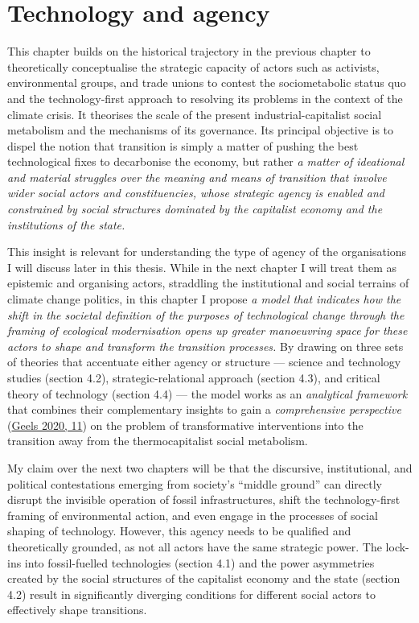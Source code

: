 \documentclass[a4paper, nobind]{templates/ociamthesis}
\begin{document}
\hypertarget{technology-and-agency}{%
\chapter{Technology and agency}\label{technology-and-agency}}

\minitoc

This chapter builds on the historical trajectory in the previous chapter to theoretically conceptualise the strategic capacity of actors such as activists, environmental groups, and trade unions to contest the sociometabolic status quo and the technology-first approach to resolving its problems in the context of the climate crisis. It theorises the scale of the present industrial-capitalist social metabolism and the mechanisms of its governance. Its principal objective is to dispel the notion that transition is simply a matter of pushing the best technological fixes to decarbonise the economy, but rather \emph{a matter of ideational and material struggles over the meaning and means of transition that involve wider social actors and constituencies, whose strategic agency is enabled and constrained by social structures dominated by the capitalist economy and the institutions of the state.}

This insight is relevant for understanding the type of agency of the organisations I will discuss later in this thesis. While in the next chapter I will treat them as epistemic and organising actors, straddling the institutional and social terrains of climate change politics, in this chapter I propose \emph{a model that indicates how the shift in the societal definition of the purposes of technological change through the framing of ecological modernisation opens up greater manoeuvring space for these actors to shape and transform the transition processes.} By drawing on three sets of theories that accentuate either agency or structure --- science and technology studies (section 4.2), strategic-relational approach (section 4.3), and critical theory of technology (section 4.4) --- the model works as an \emph{analytical framework} that combines their complementary insights to gain a \emph{comprehensive perspective} (\protect\hyperlink{ref-geels_micro-foundations_2020}{Geels 2020, 11}) on the problem of transformative interventions into the transition away from the thermocapitalist social metabolism.

My claim over the next two chapters will be that the discursive, institutional, and political contestations emerging from society's ``middle ground'' can directly disrupt the invisible operation of fossil infrastructures, shift the technology-first framing of environmental action, and even engage in the processes of social shaping of technology. However, this agency needs to be qualified and theoretically grounded, as not all actors have the same strategic power. The lock-ins into fossil-fuelled technologies (section 4.1) and the power asymmetries created by the social structures of the capitalist economy and the state (section 4.2) result in significantly diverging conditions for different social actors to effectively shape transitions.
\end{document}

